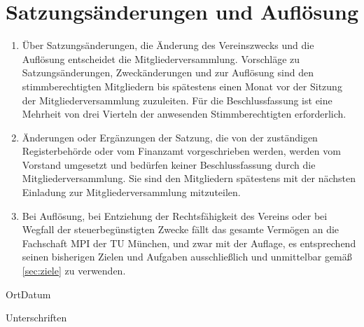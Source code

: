 \documentclass{article}
\begin{document}
\section{Satzungsänderungen und Auflösung}
\label{sec:satzungsaenderung}
\begin{enumerate}
	\item Über Satzungsänderungen, die Änderung des Vereinszwecks und die Auflösung  entscheidet die Mitgliederversammlung. Vorschläge zu Satzungsänderungen, Zweckänderungen und zur Auflösung sind den stimmberechtigten Mitgliedern bis spätestens einen Monat vor der Sitzung der Mitgliederversammlung zuzuleiten. Für die Beschlussfassung ist eine Mehrheit von drei Vierteln der anwesenden Stimmberechtigten erforderlich.
	\item Änderungen oder Ergänzungen der Satzung, die von der zuständigen Registerbehörde oder vom Finanzamt vorgeschrieben werden, werden vom Vorstand umgesetzt und bedürfen keiner Beschlussfassung durch die Mitgliederversammlung. Sie sind den Mitgliedern spätestens mit der nächsten Einladung zur Mitgliederversammlung mitzuteilen.
	\item Bei Auflösung, bei Entziehung der Rechtsfähigkeit des Vereins oder bei Wegfall der steuerbegünstigten Zwecke fällt das gesamte Vermögen an die Fachschaft MPI der TU München, und zwar mit der Auflage, es entsprechend seinen bisherigen Zielen und Aufgaben ausschließlich und unmittelbar gemäß \ref{sec:ziele} zu verwenden.
\end{enumerate}

\vspace{2cm}
\hspace{2cm}Ort\hspace{7cm}Datum
\vspace{5cm}
\begin{center}
Unterschriften
\end{center}
\end{document}
